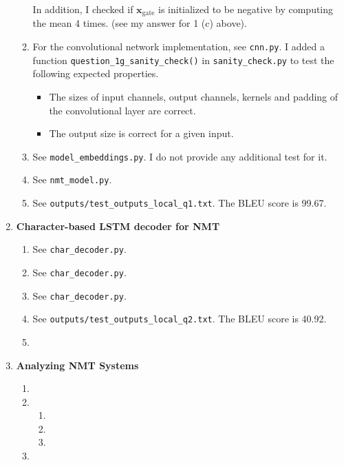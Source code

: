 \documentclass[12pt]{article}
\begin{document}
\begin{enumerate}[label=\textbf{\arabic*.}]
\begin{enumerate}[label=(\alph*)]
    In addition, I checked if $\bm{x}_\text{gate}$ is initialized to be negative by computing the mean 4 times. (see my answer for 1 (c) above).
    \item For the convolutional network implementation, see \texttt{cnn.py}. I added a function \texttt{question\_1g\_sanity\_check()} in \texttt{sanity\_check.py} to test the following expected properties.
    \begin{itemize}
      \item The sizes of input channels, output channels, kernels and padding of the convolutional layer are correct.
      \item The output size is correct for a given input.
    \end{itemize}
    \item See \texttt{model\_embeddings.py}. I do not provide any additional test for it.
    \item See \texttt{nmt\_model.py}.
    \item See \texttt{outputs/test\_outputs\_local\_q1.txt}. The BLEU score is 99.67.
  \end{enumerate}
  \item \textbf{Character-based LSTM decoder for NMT}
  \begin{enumerate}[label=(\alph*)]
    \item See \texttt{char\_decoder.py}.
    \item See \texttt{char\_decoder.py}.
    \item See \texttt{char\_decoder.py}.
    \item See \texttt{outputs/test\_outputs\_local\_q2.txt}. The BLEU score is 40.92.
    \item
  \end{enumerate}
  \item \textbf{Analyzing NMT Systems}
  \begin{enumerate}[label=(\alph*)]
    \item
    \item
    \begin{enumerate}[label=\roman*.]
      \item
      \item
      \item
    \end{enumerate}
    \item
  \end{enumerate}
\end{enumerate}
\end{document}
